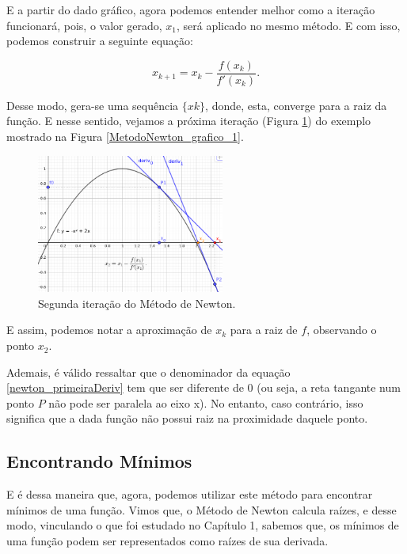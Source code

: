 E a partir do dado gráfico, agora podemos entender melhor como a iteração
funcionará, pois, o valor gerado, $x_1$, será aplicado no mesmo método. E com
isso, podemos construir a seguinte equação:

\begin{equation}
    x_{k+1} = x_{k} - \frac {f(x_{k})}{f'(x_{k})}.
    \label{newton_primeiraDeriv}
\end{equation}

Desse modo, gera-se uma sequência $\{xk\}$, donde, esta, converge para a
raiz da função. E nesse sentido, vejamos a próxima iteração (Figura
\ref{MetodoNewton_grafico_2}) do exemplo mostrado na Figura
\ref{MetodoNewton_grafico_1}.

\begin{figure}[ht]
    \centering
    \includegraphics[width=0.55\textwidth]
      {src/MetodoNewton_grafico_2.png}
    \caption{
      Segunda iteração do Método de Newton.
    }
    \label{MetodoNewton_grafico_2}
\end{figure}

E assim, podemos notar a aproximação de $x_k$ para a raiz de $f$, observando o
ponto $x_2$.

Ademais, é válido ressaltar que o denominador da equação
\ref{newton_primeiraDeriv} tem que ser diferente de 0 (ou seja, a reta tangante
num ponto $P$ não pode ser paralela ao eixo x). No entanto, caso contrário,
isso significa que a dada função não possui raiz na proximidade daquele ponto.

\subsection{Encontrando Mínimos}

E é dessa maneira que, agora, podemos utilizar este método para encontrar
mínimos de uma função. Vimos que, o Método de Newton calcula raízes, e
desse modo, vinculando o que foi estudado no Capítulo 1, sabemos que, os
mínimos de uma função podem ser representados como raízes de sua derivada.

